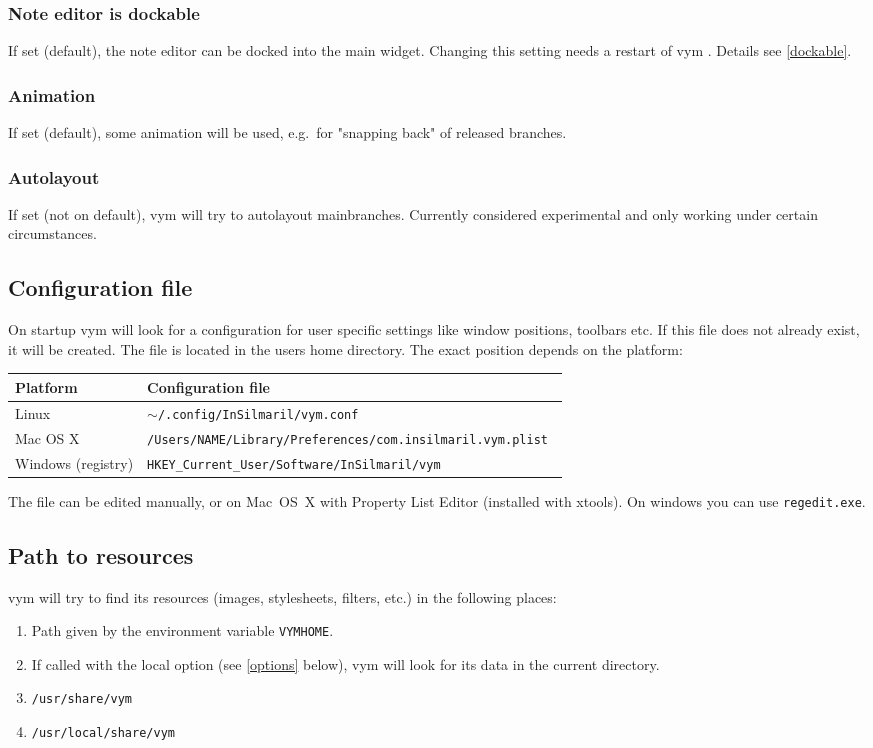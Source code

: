 \documentclass[12pt,a4paper]{article}
\newcommand{\vym}{{\sc vym }}
\begin{document}
\begin{appendix}
\subsubsection*{Note editor is dockable}
    If set (default), the note editor can be docked into the main
    widget. Changing this setting needs a restart of \vym. Details see
    \ref{dockable}.

\subsubsection*{Animation}
    If set (default), some animation will be used, e.g.\ for "snapping
    back" of released branches.

\subsubsection*{Autolayout} %
    If set (not on default), \vym will try to autolayout mainbranches.
    Currently considered experimental and only working under certain
    circumstances. 

\subsection{Configuration file}
On startup \vym will look for a configuration for user specific settings
like window positions, toolbars etc. If this file does not already
exist, it will be created. The file is located in the users home
directory. The exact position depends on the platform:
\begin{center}
\begin{tabular}{ll}
    {\bf Platform}  & {\bf Configuration file} \\ \hline
    Linux              & {\tt $\sim$/.config/InSilmaril/vym.conf  } \\
    Mac OS X           & {\tt /Users/NAME/Library/Preferences/com.insilmaril.vym.plist  } \\
    Windows (registry) & {\tt HKEY\_Current\_User/Software/InSilmaril/vym  } \\
\end{tabular}
\end{center}
The file can be edited manually, or on Mac~OS~X with Property List
Editor (installed with xtools). On windows you can use {\tt regedit.exe}.

\subsection{Path to resources}
\vym will try to find its resources (images, stylesheets, filters,
etc.) in the following places:
\begin{enumerate}
    \item Path given by the environment variable {\tt VYMHOME}.
    \item If called with the local option (see \ref{options} below),
          \vym will look for its data in the current directory.
    \item {\tt /usr/share/vym}
    \item {\tt /usr/local/share/vym}
\end{enumerate}


\end{appendix}
\end{document}
